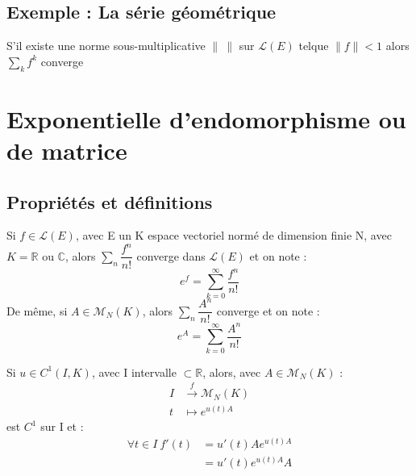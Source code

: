 \subsection{Exemple : La série géométrique}
\begin{prop}
S'il existe une norme sous-multiplicative $\parallel~\parallel$ sur $\mathcal{L}(E)$ telque $\parallel f\parallel < 1$ alors $\underset{k} \sum f^k$ converge
\end{prop}
\section{Exponentielle d'endomorphisme ou de matrice}
\subsection{Propriétés et définitions}
\begin{de}
Si $f \in \mathcal{L}(E)$, avec E un K espace vectoriel normé de dimension finie N, avec $K = \mathbb{R}$ ou $\mathbb{C}$, alors $\underset{n} \sum \dfrac{f^n}{n!}$ converge dans $\mathcal{L}(E)$ et on note : 
$$e^f = \sum_{k=0}^{\infty} \dfrac{f^n}{n!}$$
De même, si $A \in \mathcal{M}_N(K)$, alors $\underset{n} \sum \dfrac{A^n}{n!}$ converge et on note : 
$$e^A = \sum_{k=0}^{\infty} \dfrac{A^n}{n!}$$
\end{de}
\begin{prop}
Si $u \in C^1(I,K)$, avec I intervalle $\subset \mathbb{R}$, alors, avec $A \in \mathcal{M}_N(K)$ : 
\begin{align*}
 I &\overset{f}\rightarrow \mathcal{M}_N(K)\\
 t &\mapsto e^{u(t)A}
\end{align*}
est $C^1$ sur I et :
\begin{align*}
\forall t \in I~ f'(t)&=u'(t)Ae^{u(t)A} \\
		      &=u'(t)e^{u(t)A}A	
\end{align*}
\end{prop}
